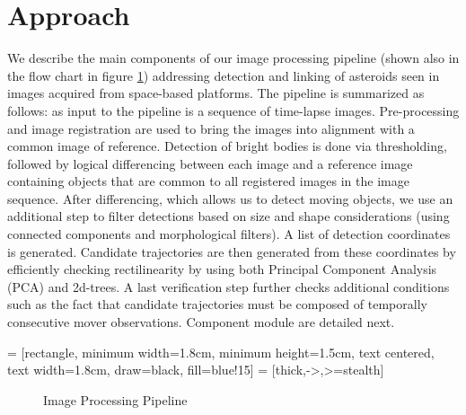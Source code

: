 \documentclass{article}
\begin{document}

\section{Approach}
\label{sec:approach}

We describe the main components of our image processing pipeline (shown also in the flow chart in figure \ref{IPP}) addressing detection and linking of asteroids seen in images acquired from space-based platforms.  The pipeline is summarized as follows: as input to the pipeline is a sequence of time-lapse images. Pre-processing and image registration are used to bring the images into alignment with a common image of reference.  Detection of bright bodies is done via thresholding, followed by logical differencing between each image and a reference image containing objects that are common to all registered images in the image sequence.  After differencing, which allows us to detect moving objects, we use an additional step to filter detections based on size and shape considerations (using connected components and morphological filters).  A list of detection coordinates is generated.  Candidate trajectories are then generated from these coordinates by efficiently checking rectilinearity by using both Principal Component Analysis (PCA) and 2d-trees.  A last verification step further checks additional conditions such as the fact that candidate trajectories must be composed of temporally consecutive mover observations.  Component module are detailed next. 

 = [rectangle, minimum width=1.8cm, minimum height=1.5cm, text centered, text width=1.8cm, draw=black, fill=blue!15]
 = [thick,->,>=stealth]
\begin{figure}[b]
\vspace{-0.7cm}
\caption{Image Processing Pipeline}
\label{IPP}
\end{figure}
\end{document}
